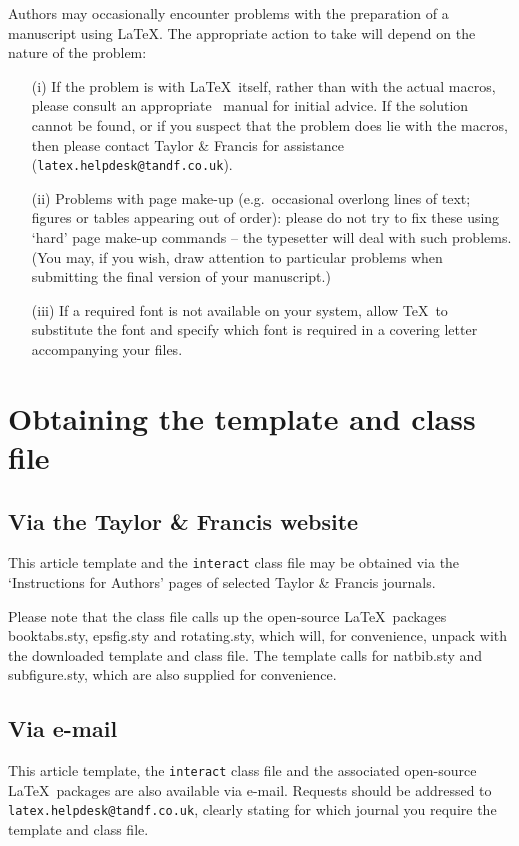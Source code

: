 \documentclass[]{interact}
\theoremstyle{plain}%
\theoremstyle{definition}
\theoremstyle{remark}
\begin{document}
Authors may occasionally encounter problems with the preparation of a manuscript using \LaTeX. The appropriate action to take will depend on the nature of the problem:
\begin{enumerate}
\item[(i)] If the problem is with \LaTeX\ itself, rather than with the actual macros, please consult an appropriate \LaTeXe\ manual for initial advice. If the solution cannot be found, or if you suspect that the problem does lie with the macros, then please contact Taylor \& Francis for assistance (\texttt{latex.helpdesk@tandf.co.uk}).
\item[(ii)] Problems with page make-up (e.g.\ occasional overlong lines of text; figures or tables appearing out of order): please do not try to fix these using `hard' page make-up commands -- the typesetter will deal with such problems. (You may, if you wish, draw attention to particular problems when submitting the final version of your manuscript.)
\item[(iii)] If a required font is not available on your system, allow \TeX\ to substitute the font and specify which font is required in a covering letter accompanying your files.
\end{enumerate}


\section{Obtaining the template and class file}

\subsection{Via the Taylor \& Francis website}

This article template and the \texttt{interact} class file may be obtained via the `Instructions for Authors' pages of selected Taylor \& Francis journals.

Please note that the class file calls up the open-source \LaTeX\ packages booktabs.sty, epsfig.sty and rotating.sty, which will, for convenience, unpack with the downloaded template and class file. The template calls for natbib.sty and subfigure.sty, which are also supplied for convenience.


\subsection{Via e-mail}

This article template, the \texttt{interact} class file and the associated open-source \LaTeX\ packages are also available via e-mail. Requests should be addressed to \texttt{latex.helpdesk@tandf.co.uk}, clearly stating for which journal you require the template and class file.
\end{document}
